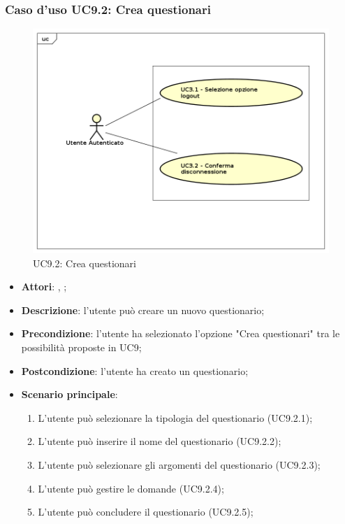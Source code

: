 	\subsubsection{Caso d'uso UC9.2: Crea questionari}
	\label{UC9.2}
	\begin{figure}[h]
		\centering
	\includegraphics[scale=0.5,keepaspectratio]{UML/UC9.png}
		\caption{UC9.2: Crea questionari}
	\end{figure}
	\FloatBarrier
	\begin{itemize}
		\item \textbf{Attori}: \uau, \uaupro;
		\item \textbf{Descrizione}: l'utente può creare un nuovo questionario; 
		\item \textbf{Precondizione}: l'utente ha selezionato l'opzione "Crea questionari" tra le possibilità proposte in UC9;
		\item \textbf{Postcondizione}: l'utente ha creato un questionario;
		\item \textbf{Scenario principale}:
			\begin{enumerate}
				\item L'utente può selezionare la tipologia del questionario (UC9.2.1);
				\item L'utente può inserire il nome del questionario (UC9.2.2);
				\item L'utente può selezionare gli argomenti del questionario (UC9.2.3);
				\item L'utente può gestire le domande (UC9.2.4);
				\item L'utente può concludere il questionario (UC9.2.5);
			\end{enumerate}
	\end{itemize}
	

